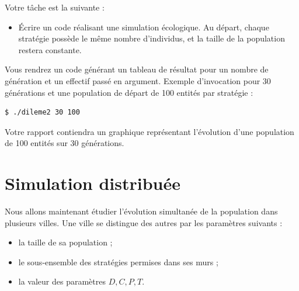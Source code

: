 \documentclass[11pt]{article}
\begin{document}




\medskip

Votre tâche est la suivante :
\begin{itemize}
 \item Écrire un code réalisant une simulation écologique.
  Au départ, chaque stratégie possède le même nombre d'individus, et la
  taille de la population restera constante.
\end{itemize}

Vous rendrez un code générant un tableau de résultat pour un nombre de génération et un effectif passé en argument.
Exemple d'invocation pour 30 générations et une population de départ de 100 entités par stratégie :

\begin{verbatim}
$ ./dileme2 30 100
\end{verbatim}

Votre rapport contiendra un graphique représentant l'évolution d'une population de 100 entités sur 30 générations.

\section{Simulation distribuée}

Nous allons maintenant étudier l'évolution simultanée de la population dans
plusieurs villes. Une ville se distingue des autres par les paramètres
suivants :

\begin{itemize}
\item la taille de sa population ;
\item le sous-ensemble des stratégies permises dans ses murs ;
\item la valeur des paramètres $D,C,P,T$.
\end{itemize}
\end{document}
